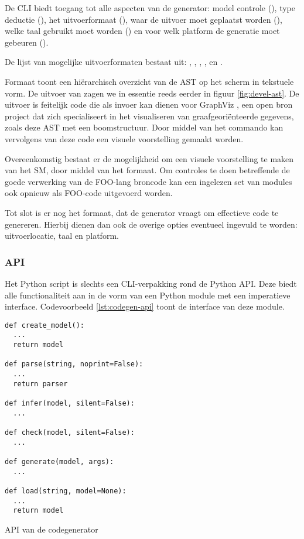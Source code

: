 De CLI biedt toegang tot alle aspecten van de generator: model controle
(), type deductie (), het uitvoerformaat (),
waar de uitvoer moet geplaatst worden (), welke taal gebruikt moet
worden () en voor welk platform de generatie moet gebeuren
().

De lijst van mogelijke uitvoerformaten bestaat uit: , ,
, ,  en .

Formaat  toont een hi\"erarchisch overzicht van de AST op het scherm
in tekstuele vorm. De uitvoer van  zagen we in essentie reeds
eerder in figuur \ref{fig:devel-ast}. De uitvoer is feitelijk code die als
invoer kan dienen voor GraphViz \citep{url:graphviz}, een open bron project dat
zich specialiseert in het visualiseren van graafgeori\"enteerde gegevens, zoals
deze AST met een boomstructuur. Door middel van het  commando kan
vervolgens van deze code een visuele voorstelling gemaakt worden.

Overeenkomstig bestaat er de mogelijkheid om een visuele voorstelling te maken
van het SM, door middel van het  formaat. Om controles te doen
betreffende de goede verwerking van de FOO-lang broncode kan een ingelezen set
van modules ook opnieuw als FOO-code uitgevoerd worden.

Tot slot is er nog het  formaat, dat de generator vraagt om
effectieve code te genereren. Hierbij dienen dan ook de overige opties
eventueel ingevuld te worden: uitvoerlocatie, taal en platform.

\subsubsection{API}

Het  Python script is slechts een CLI-verpakking rond de Python
API. Deze biedt alle functionaliteit aan in de vorm van een Python module met
een imperatieve interface. Codevoorbeeld \ref{lst:codegen-api} toont de interface
van deze module.

\begin{listing}[ht]
  \begin{verbatim}
def create_model():
  ...
  return model

def parse(string, noprint=False):
  ...
  return parser

def infer(model, silent=False):
  ...

def check(model, silent=False):
  ...

def generate(model, args):
  ...

def load(string, model=None):
  ...
  return model
  \end{verbatim}
  \vspace{-5mm}
  \caption{API van de codegenerator}
  \label{lst:codegen-api}
\end{listing}

